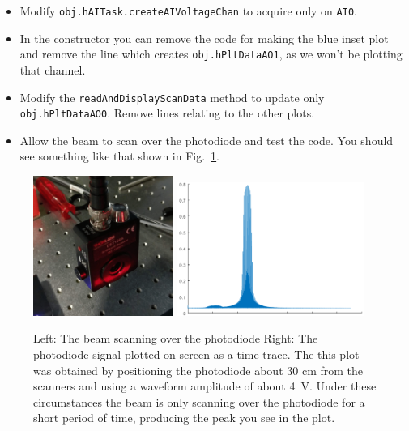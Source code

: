 \documentclass[a4paper]{report}
\begin{document}
\begin{itemize}
    \setlength\itemsep{0.15em}
    \item Modify \texttt{obj.hAITask.createAIVoltageChan} to acquire only on \texttt{AI0}.
    \item In the constructor you can remove the code for making the blue inset plot and remove the line which creates \texttt{obj.hPltDataAO1}, as we won't be plotting that channel.
    \item Modify the \texttt{readAndDisplayScanData} method to update only \texttt{obj.hPltDataAO0}. Remove lines relating to the other plots. 
    \item Allow the beam to scan over the photodiode and test the code. 
    You should see something like that shown in Fig.~\ref{lineOnPD}. 
\end{itemize}

\noindent


\begin{figure}[h]
\centering
\includegraphics[width=1.8in]{BeamScanningOverPhotoDiode.png}
\includegraphics[width=2.4in]{photodiode_lineTrace.png}
\caption{Left: The beam scanning over the photodiode
         Right: The photodiode signal plotted on screen as a time trace.
         The this plot was obtained by positioning the photodiode about 30 cm from the scanners and using a waveform amplitude of about 4~V. 
         Under these circumstances the beam is only scanning over the photodiode for a short period of time, producing the peak you see in the plot. }
\label{lineOnPD}
\end{figure}
\end{document}
